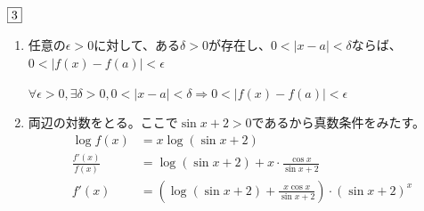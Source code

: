 \begin{souanswer} %
	$\fbox{3}$
\begin{enumerate}
	\item 任意の$\epsilon> 0$に対して、ある$\delta> 0$が存在し、$	0< |x- a|< \delta$ならば、$0< |f(x)- f(a)|< \epsilon$
\begin{tcolorbox}[title= 論理記号ver.]
	$\forall \epsilon>0, \exists \delta> 0, 0< |x- a|< \delta \Longrightarrow 0< |f(x)- f(a)|< \epsilon$
\end{tcolorbox}

	\item 両辺の対数をとる。ここで$\sin{x}+ 2> 0$であるから真数条件をみたす。
\begin{align*}
	\log{f(x)}&= x\log{(\sin{x}+ 2)}\\
	\frac{f'(x)}{f(x)}&= \log{(\sin{x}+ 2)}+ x\cdot \frac{\cos{x}}{\sin{x}+ 2}\\
	f'(x)&= \left(\log{(\sin{x}+ 2)}+ \frac{x\cos{x}}{\sin{x}+ 2}\right)\cdot(\sin{x}+ 2)^x
\end{align*}


\end{enumerate}
\end{souanswer}
